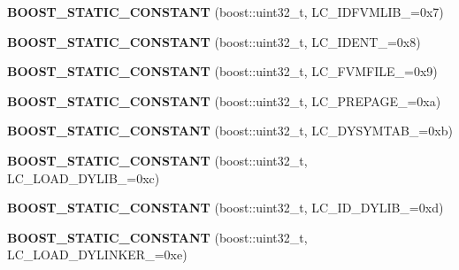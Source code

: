\begin{DoxyCompactItemize}
\item 
{\bfseries B\+O\+O\+S\+T\+\_\+\+S\+T\+A\+T\+I\+C\+\_\+\+C\+O\+N\+S\+T\+A\+NT} (boost\+::uint32\+\_\+t, L\+C\+\_\+\+I\+D\+F\+V\+M\+L\+I\+B\+\_\+=0x7)\hypertarget{a00194_a021af84fa3c6d7a0ae132277d99e82a8}{}\label{a00194_a021af84fa3c6d7a0ae132277d99e82a8}

\item 
{\bfseries B\+O\+O\+S\+T\+\_\+\+S\+T\+A\+T\+I\+C\+\_\+\+C\+O\+N\+S\+T\+A\+NT} (boost\+::uint32\+\_\+t, L\+C\+\_\+\+I\+D\+E\+N\+T\+\_\+=0x8)\hypertarget{a00194_a28741faf365266ae924d26b3212c4207}{}\label{a00194_a28741faf365266ae924d26b3212c4207}

\item 
{\bfseries B\+O\+O\+S\+T\+\_\+\+S\+T\+A\+T\+I\+C\+\_\+\+C\+O\+N\+S\+T\+A\+NT} (boost\+::uint32\+\_\+t, L\+C\+\_\+\+F\+V\+M\+F\+I\+L\+E\+\_\+=0x9)\hypertarget{a00194_abbdea1e3fca227593cc23bef87a2c215}{}\label{a00194_abbdea1e3fca227593cc23bef87a2c215}

\item 
{\bfseries B\+O\+O\+S\+T\+\_\+\+S\+T\+A\+T\+I\+C\+\_\+\+C\+O\+N\+S\+T\+A\+NT} (boost\+::uint32\+\_\+t, L\+C\+\_\+\+P\+R\+E\+P\+A\+G\+E\+\_\+=0xa)\hypertarget{a00194_a0114e34cf3b049abcf673cc4de66a4a0}{}\label{a00194_a0114e34cf3b049abcf673cc4de66a4a0}

\item 
{\bfseries B\+O\+O\+S\+T\+\_\+\+S\+T\+A\+T\+I\+C\+\_\+\+C\+O\+N\+S\+T\+A\+NT} (boost\+::uint32\+\_\+t, L\+C\+\_\+\+D\+Y\+S\+Y\+M\+T\+A\+B\+\_\+=0xb)\hypertarget{a00194_a3d1aa782247ff950063e7a5de7a71866}{}\label{a00194_a3d1aa782247ff950063e7a5de7a71866}

\item 
{\bfseries B\+O\+O\+S\+T\+\_\+\+S\+T\+A\+T\+I\+C\+\_\+\+C\+O\+N\+S\+T\+A\+NT} (boost\+::uint32\+\_\+t, L\+C\+\_\+\+L\+O\+A\+D\+\_\+\+D\+Y\+L\+I\+B\+\_\+=0xc)\hypertarget{a00194_a3301ef9bdc0d879f571c8f2cd8d4d58e}{}\label{a00194_a3301ef9bdc0d879f571c8f2cd8d4d58e}

\item 
{\bfseries B\+O\+O\+S\+T\+\_\+\+S\+T\+A\+T\+I\+C\+\_\+\+C\+O\+N\+S\+T\+A\+NT} (boost\+::uint32\+\_\+t, L\+C\+\_\+\+I\+D\+\_\+\+D\+Y\+L\+I\+B\+\_\+=0xd)\hypertarget{a00194_ad845836550a5fab99f808b57c8add154}{}\label{a00194_ad845836550a5fab99f808b57c8add154}

\item 
{\bfseries B\+O\+O\+S\+T\+\_\+\+S\+T\+A\+T\+I\+C\+\_\+\+C\+O\+N\+S\+T\+A\+NT} (boost\+::uint32\+\_\+t, L\+C\+\_\+\+L\+O\+A\+D\+\_\+\+D\+Y\+L\+I\+N\+K\+E\+R\+\_\+=0xe)\hypertarget{a00194_a23627ff05ca189c03781a23a55885457}{}\label{a00194_a23627ff05ca189c03781a23a55885457}


\end{DoxyCompactItemize}
